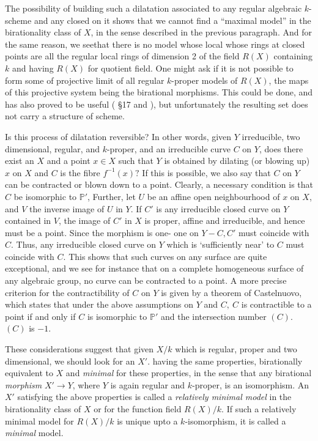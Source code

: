  The possibility of building such a dilatation associated to any
 regular algebraic $k$-scheme and any closed on it shows that we
 cannot find a ``maximal model'' in the birationality  class of $X$, in
 the sense described in the previous paragraph. And for the same
 reason, we see\pageoriginale that there is no model whose local whose
 rings at closed points are all the regular local rings of dimension 2 of the
 field $R(X)$ containing $k$ and having $R(X)$ for quotient field. One
 might ask if it is not possible to form some of projective limit of
 all regular $k$-proper models of $R(X)$, the maps of this projective
 system being the birational morphisms. This could be done, and has
 also proved to be useful (\cf \cite{key26} \S 17 and \cite{key17}), but
 unfortunately the resulting set does not carry a structure of scheme. 
 
 Is this process of dilatation reversible? In other words, given $Y$
 irreducible, two dimensional, regular, and $k$-proper, and an
 irreducible curve $C$ on $Y$, does there exist an $X$ and a point $x
 \in X$ such that $Y$ is obtained by dilating (or blowing up) $x$ on
 $X$ and $C$ is the fibre $f^{-1} (x)?$ If this is possible, we also
 say that $C$ on $Y$ can be contracted or blown down to a
 point. Clearly, a  necessary condition is that $C$ be isomorphic to
 $\mathbb{P}'$,  Further, let $U$ be an affine open neighbourhood of
 $x$ on $X$, and $V$ the inverse image of $U$ in $Y$.  If $C'$ is any
 irreducible closed curve on $Y$ contained in $V$, the image of $C'$
 in $X$ is proper, affine and irreducible, and hence must be a
 point. Since the morphism is one- one on $Y-C, C'$ must coincide with
 $C$. Thus, any irreducible closed  curve on $Y$ which is
 `sufficiently near' to $C$ must coincide with $C$. This shows
 that such curves on any surface are quite exceptional, and we see for
 instance that on a complete homogeneous surface of any  algebraic
 group, no curve can be contracted to a point. A more precise\pageoriginale
 criterion for the contractibility of $C$ on $Y$ is given  by  a
 theorem  of Castelnuovo, which states that under the above
 assumptions on $Y$ and $C, ~ C$ is contractible to a point if and
 only if $C$ is isomorphic to $\mathbb{P}'$ and the intersection
 number  $(C)$. $(C)$ is $-1$.  
 
 These considerations suggest that given $X/k$ which is regular,
 proper and two dimensional, we should look for an $X'$. having the
 same properties, birationally equivalent to $X$ and \textit{minimal}
 for these properties, in the sense that any birational
 \textit{morphism} $X' \rightarrow Y$, where $Y$ is again regular and
 $k$-proper, is an  isomorphism. An $X'$ satisfying the above
 properties is called a \textit{relatively minimal model} in the
 birationality class of $X$ or for the function  field $R(X)/k$. If
 such a relatively minimal model for $R(X)/k$ is unique upto  a
 $k$-isomorphism, it is called a \textit{minimal} model.  
 
